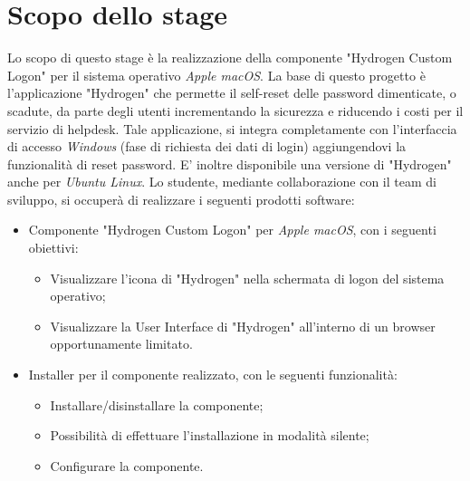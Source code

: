 \section*{Scopo dello stage}
Lo scopo di questo stage è la realizzazione della componente "Hydrogen Custom Logon" per il sistema operativo \textit{Apple macOS}.\newline
La base di questo progetto è l'applicazione "Hydrogen" che permette il self-reset delle password dimenticate, o scadute, da parte degli utenti incrementando la sicurezza e riducendo i costi per il servizio di helpdesk.
Tale applicazione, si integra completamente con l'interfaccia di accesso \textit{Windows} (fase di richiesta dei dati di login) aggiungendovi la funzionalità di reset password. E' inoltre disponibile una versione di "Hydrogen" anche per \textit{Ubuntu Linux}.
\newline
Lo studente, mediante collaborazione con il team di sviluppo, si occuperà di realizzare i seguenti prodotti software:
\begin{itemize}
	\item Componente "Hydrogen Custom Logon" per \textit{Apple macOS}, con i seguenti obiettivi:
	\begin{itemize}
		\item Visualizzare l'icona di "Hydrogen" nella schermata di logon del sistema operativo;
		\item Visualizzare la User Interface di "Hydrogen" all'interno di un browser opportunamente limitato.
	\end{itemize}
	\item Installer per il componente realizzato, con le seguenti funzionalità:
	\begin{itemize}
		\item Installare/disinstallare la componente;
		\item Possibilità di effettuare l'installazione in modalità silente;
		\item Configurare la componente.
	\end{itemize}
\end{itemize}

